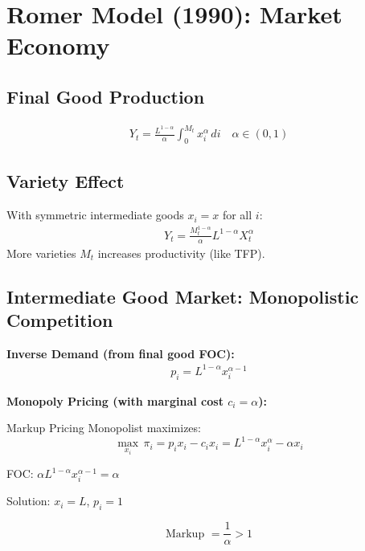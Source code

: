 \documentclass[a4paper,11pt]{article}
\begin{document}
\section{Romer Model (1990): Market Economy}

\subsection*{Final Good Production}
\begin{align*}
Y_t = \frac{L^{1-\alpha}}{\alpha} \int_0^{M_t} x_i^\alpha \, di \quad \alpha \in (0,1)
\tag{Final Good}
\end{align*}

\medskip
\subsection*{Variety Effect}
With symmetric intermediate goods $x_i = x$ for all $i$:
\begin{align*}
Y_t = \frac{M_t^{1-\alpha}}{\alpha} L^{1-\alpha} X_t^\alpha \tag{Variety Effect}
\end{align*}
More varieties $M_t$ increases productivity (like TFP).

\medskip
\subsection*{Intermediate Good Market: Monopolistic Competition}

\medskip
\noindent\textbf{Inverse Demand (from final good FOC):}
\begin{align*}
p_i = L^{1-\alpha} x_i^{\alpha-1} \tag{Demand}
\end{align*}

\medskip
\noindent\textbf{Monopoly Pricing (with marginal cost $c_i = \alpha$):}
\begin{derivationbox}{Markup Pricing}
Monopolist maximizes:
\[
\max_{x_i} \, \pi_i = p_i x_i - c_i x_i = L^{1-\alpha} x_i^\alpha - \alpha x_i
\]

FOC: $\alpha L^{1-\alpha} x_i^{\alpha-1} = \alpha$

Solution: $x_i = L$, $p_i = 1$
\end{derivationbox}

\begin{resultbox}
\[
\boxed{\text{Markup } = \frac{1}{\alpha} > 1}
\tag{Markup}
\]
\end{resultbox}
\end{document}
